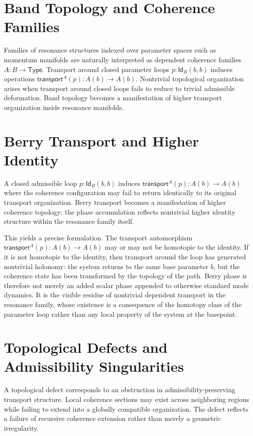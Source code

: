 \documentclass[11pt,openany]{book}
\theoremstyle{definition}
\theoremstyle{plain}
\newcommand{\Type}{\mathsf{Type}}
\newcommand{\idtype}{\mathsf{Id}}
\newcommand{\transport}{\mathsf{transport}}
\begin{document}
\section{Band Topology and Coherence Families}

Families of resonance structures indexed over parameter spaces such as momentum manifolds are naturally interpreted as dependent coherence families $A : B \to \Type$. Transport around closed parameter loops $p : \idtype_B(b,b)$ induces operations $\transport^A(p) : A(b) \to A(b)$. Nontrivial topological organization arises when transport around closed loops fails to reduce to trivial admissible deformation. Band topology becomes a manifestation of higher transport organization inside resonance manifolds.

\section{Berry Transport and Higher Identity}

A closed admissible loop $p : \idtype_B(b,b)$ induces $\transport^A(p) : A(b) \to A(b)$ where the coherence configuration may fail to return identically to its original transport organization. Berry transport becomes a manifestation of higher coherence topology: the phase accumulation reflects nontrivial higher identity structure within the resonance family itself.

This yields a precise formulation. The transport automorphism $\transport^A(p) : A(b) \to A(b)$ may or may not be homotopic to the identity. If it is not homotopic to the identity, then transport around the loop has generated nontrivial holonomy: the system returns to the same base parameter $b$, but the coherence state has been transformed by the topology of the path. Berry phase is therefore not merely an added scalar phase appended to otherwise standard mode dynamics. It is the visible residue of nontrivial dependent transport in the resonance family, whose existence is a consequence of the homotopy class of the parameter loop rather than any local property of the system at the basepoint.

\section{Topological Defects and Admissibility Singularities}

A topological defect corresponds to an obstruction in admissibility-preserving transport structure. Local coherence sections may exist across neighboring regions while failing to extend into a globally compatible organization. The defect reflects a failure of recursive coherence extension rather than merely a geometric irregularity.
\end{document}
